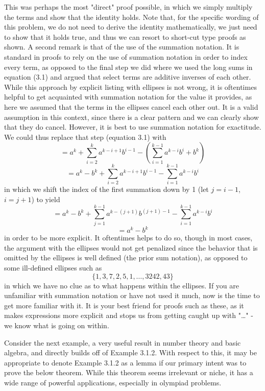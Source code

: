 This was perhaps the most "direct" proof possible, in which we simply multiply the terms and show that the identity holds. Note that, for the specific wording of this problem, we do not need to derive the identity mathematically, we just need to show that it holds true, and thus we can resort to short-cut type proofs as shown. A second remark is that of the use of the summation notation. It is standard in proofs to rely on the use of summation notation in order to index every term, as opposed to the final step we did where we used the long sums in equation (3.1) and argued that select terms are additive inverses of each other. While this approach by explicit listing with ellipses is not wrong, it is oftentimes helpful to get acquainted with summation notation for the value it provides, as here we assumed that the terms in the ellipses cancel each other out. It is a valid assumption in this context, since there is a clear pattern and we can clearly show that they do cancel. However, it is best to use summation notation for exactitude. We could thus replace that step (equation 3.1) with 
\[
= a^k + \sum_{i=2}^{k}a^{k-i+1}b^{i-1} - \left(  \sum_{i=1}^{k-1}{a^{k-i}b^{i}} + b^k \right)
\]
\[
= a^k - b^k + \sum_{i=2}^{k}a^{k-i+1}b^{i-1} - \sum_{i=1}^{k-1}{a^{k-i}b^{i}}
\]
in which we shift the index of the first summation down by 1 (let $j = i - 1$, $i = j+1$) to yield
\[
= a^k - b^k + \sum_{j=1}^{k-1}a^{k-(j+1)}b^{(j+1)-1} - \sum_{i=1}^{k-1}{a^{k-i}b^{i}}
\]
\[
=a^k - b^k
\]
in order to be more explicit. It oftentimes helps to do so, though in most cases, the argument with the ellipses would not get penalized since the behavior that is omitted by the ellipses is well defined (the prior sum notation), as opposed to some ill-defined ellipses such as 
\[\{1, 3, 7, 2, 5, 1, \ldots , 3242,4 3 \}\]
in which we have no clue as to what happens within the ellipses. If you are unfamiliar with summation notation or have not used it much, now is the time to get more familiar with it. It is your best friend for proofs such as these, as it makes expressions more explicit and stops us from getting caught up with "\ldots" - we know what is going on within. 

Consider the next example, a very useful result in number theory and basic algebra, and directly builds off of Example 3.1.2. With respect to this, it may be appropriate to denote Example 3.1.2 as a lemma if our primary intent was to prove the below theorem. While this theorem seems irrelevant or niche, it has a wide range of powerful applications, especially in olympiad problems.

